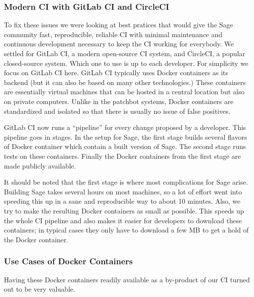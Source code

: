 \documentclass{deliverablereport}
\begin{document}
\subsubsection{Modern CI with GitLab CI and CircleCI}
To fix these issues we were looking at best pratices that would give the
Sage community fast, reproducible, reliable CI with minimal maintenance and
continuous development necessary to keep the CI working for everybody.  We
settled for GitLab CI, a modern open-source CI system, and CircleCI, a popular
closed-source system. Which one to use is up to each developer. For simplicity
we focus on GitLab CI here. GitLab CI typically uses Docker containers as its
backend (but it can also be based on many other technologies.) These containers
are essentially virtual machines that can be hosted in a central location but
also on private computers. Unlike in the patchbot systems, Docker containers
are standardized and isolated so that there is usually no issue of false
positives. %

GitLab CI now runs a ``pipeline'' for every change proposed by a developer.
This pipeline goes in stages. In the setup for Sage, the first stage builds
several flavors of Docker container which contain a built version of Sage. The
second stage runs tests on these containers. Finally the Docker containers from
the first stage are made publicly available.

It should be noted that the first stage is where most complications for Sage
arise. Building Sage takes several hours on most machines, so a lot of effort
went into speeding this up in a sane and reproducible way to about 10 minutes.
Also, we try to make the resulting Docker containers as small as possible. This
speeds up the whole CI pipeline and also makes it easier for developers to
download these containers; in typical cases they only have to download a few MB
to get a hold of the Docker container.

\subsubsection{Use Cases of Docker Containers}
Having these Docker containers readily available as a by-product of our CI turned out to be very valuable.
\end{document}
